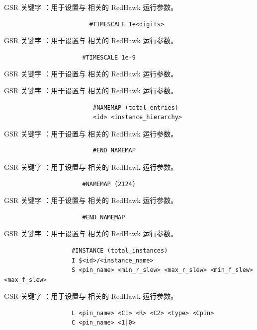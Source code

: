 GSR 关键字 ：用于设置与  相关的 RedHawk 运行参数。

\begin{lstlisting}
                        #TIMESCALE 1e<digits>
\end{lstlisting}

GSR 关键字 ：用于设置与  相关的 RedHawk 运行参数。

\begin{lstlisting}
                      #TIMESCALE 1e-9
\end{lstlisting}

GSR 关键字 ：用于设置与  相关的 RedHawk 运行参数。

GSR 关键字 ：用于设置与  相关的 RedHawk 运行参数。

\begin{lstlisting}
                         #NAMEMAP (total_entries)
                         <id> <instance_hierarchy>
\end{lstlisting}

GSR 关键字 ：用于设置与  相关的 RedHawk 运行参数。

\begin{lstlisting}
                         #END NAMEMAP
\end{lstlisting}

GSR 关键字 ：用于设置与  相关的 RedHawk 运行参数。

\begin{lstlisting}
                      #NAMEMAP (2124)
\end{lstlisting}

GSR 关键字 ：用于设置与  相关的 RedHawk 运行参数。

\begin{lstlisting}
                      #END NAMEMAP
\end{lstlisting}

GSR 关键字 ：用于设置与  相关的 RedHawk 运行参数。

\begin{lstlisting}
                   #INSTANCE (total_instances)
                   I $<id>/<instance_name>
                   S <pin_name> <min_r_slew> <max_r_slew> <min_f_slew> <max_f_slew>
\end{lstlisting}

GSR 关键字 ：用于设置与  相关的 RedHawk 运行参数。

\begin{lstlisting}
                   L <pin_name> <C1> <R> <C2> <type> <Cpin>
                   C <pin_name> <1|0>
\end{lstlisting}

